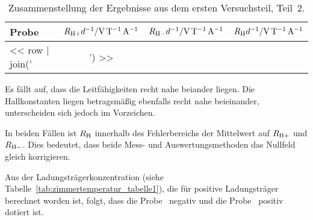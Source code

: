 \begin{table}[htbp]
    \centering
    \begin{tabular}{lSSS}
        Probe &
        {$R_{\text H+} d^{-1} / \si{\volt\per\tesla\per\ampere}$} &
        {$R_{\text H-} d^{-1} / \si{\volt\per\tesla\per\ampere}$} &
        {$R_{\text H} d^{-1} / \si{\volt\per\tesla\per\ampere}$} \\
        \midrule
        << row | join(' & ') >> \\
    \end{tabular}
    \caption{%
        Zusammenstellung der Ergebnisse aus dem ersten Versuchsteil, Teil~2.
    }
    \label{tab:zimmertemperatur_tabelle2}
\end{table}

Es fällt auf, dass die Leitfähigkeiten recht nahe beiander
liegen. Die Hallkonstanten liegen betragsmäßig ebenfalls recht nahe
beieinander, unterscheiden sich jedoch im Vorzeichen.

In beiden Fällen ist $R_\text H$ innerhalb des Fehlerbereichs der Mittelwert
auf $R_{\text H+}$ und $R_{\text H-}$. Dies bedeutet, dass beide Mess- und
Auswertungsmethoden das Nullfeld gleich korrigieren.

Aus der Ladungsträgerkonzentration (siehe
Tabelle~\ref{tab:zimmertemperatur_tabelle1}), die für positive Ladungsträger
berechnet worden ist, folgt, dass die Probe~\probeA{} negativ und die
Probe~\probeB{} positiv dotiert ist.

\printbibliography



